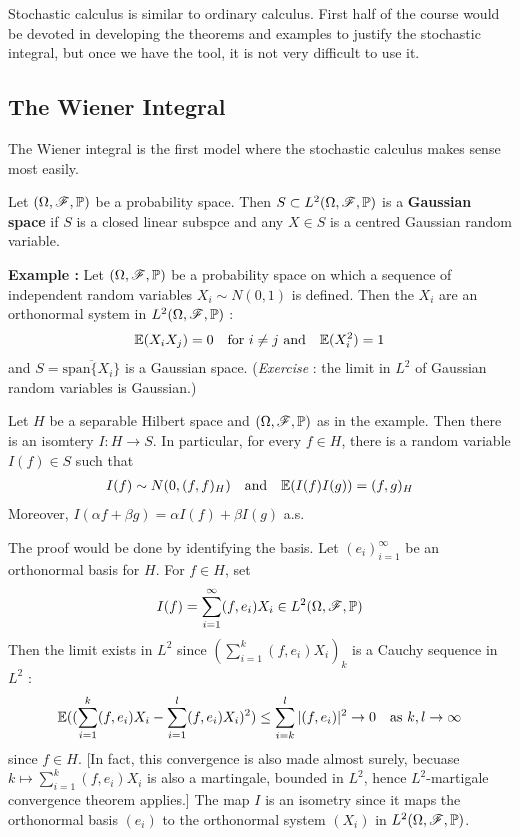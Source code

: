 \documentclass[12pt,a4paper]{article}
\newenvironment{proof}
{\begin{changemargin}{0.5cm}{0.5cm} 
	}%
	{\end{changemargin}
}
\newenvironment{p}
{\begin{proof} 
	}%
	{\end{proof}
}
\begin{document}
Stochastic calculus is similar to ordinary calculus. First half of the course would be devoted in developing the theorems and examples to justify the stochastic integral, but once we have the tool, it is not very difficult to use it.

\subsection{The Wiener Integral}

The Wiener integral is the first model where the stochastic calculus makes sense most easily.
\s

 Let $(\Omega, \mathscr{F}, \mathbb{P})$ be a probability space. Then $S\subset L^2(\Omega, \mathscr{F}, \mathbb{P})$ is a \textbf{Gaussian space} if $S$ is a closed linear subspce and any $X\in S$ is a centred Gaussian random variable.
\s

\textbf{Example :} Let $(\Omega, \mathscr{F}, \mathbb{P})$ be a probability space on which a sequence of independent random variables $X_i \sim N(0,1)$ is defined. Then the $X_i$ are an orthonormal system in $L^2(\Omega, \mathscr{F}, \mathbb{P})$ :
\begin{align*}
\mathbb{E}(X_i X_j) =0 \quad \text{for } i\neq j \text{ and} \quad \mathbb{E}(X_i^2) =1 
\end{align*}
and $S= \overline{\text{span} \{X_i\}}$ is a Gaussian space. (\textit{Exercise} : the limit in $L^2$ of Gaussian random variables is Gaussian.)
\s

\prop Let $H$ be a separable Hilbert space and $(\Omega, \mathscr{F}, \mathbb{P})$ as in the example. Then there is an isomtery $I: H\rightarrow S$. In particular, for every $f\in H$, there is a random variable $I(f) \in S$ such that
\begin{align*}
I(f) \sim N(0, (f,f)_H) \quad \text{and} \quad \mathbb{E}(I(f)I(g)) = (f,g)_H
\end{align*}
Moreover, $I(\alpha f + \beta g) = \alpha I(f) + \beta I(g)$ a.s.
\begin{p}
\pf The proof would be done by identifying the basis. Let $(e_i)_{i=1}^{\infty}$ be an orthonormal basis for $H$. For $f\in H$, set
\begin{align*}
I(f) = \sum_{i=1}^{\infty} (f,e_i)X_i \in L^2(\Omega, \mathscr{F}, \mathbb{P})
\end{align*}
Then the limit exists in $L^2$ since $(\sum_{i=1}^k (f, e_i)X_i)_k$ is a Cauchy sequence in $L^2$ :
\begin{align*}
\mathbb{E}((\sum_{i=1}^k (f,e_i)X_i - \sum_{i=1}^l (f,e_i)X_i)^2) \leq \sum_{i=k}^l |(f, e_i)|^2 \rightarrow 0 \quad \text{as } k,l\rightarrow \infty
\end{align*}
since $f\in H$. [In fact, this convergence is also made almost surely, becuase $k\mapsto \sum_{i=1}^k (f,e_i)X_i$ is also a martingale, bounded in $L^2$, hence $L^2$-martigale convergence theorem applies.] The map $I$ is an isometry since it maps the orthonormal basis $(e_i)$ to the orthonormal system $(X_i)$ in $L^2(\Omega, \mathscr{F}, \mathbb{P})$.

\eop
\end{p}
\s
\end{document}
